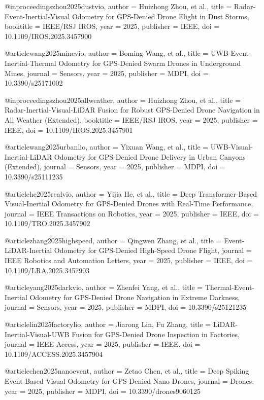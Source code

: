 @inproceedings{zhou2025dustvio,
  author = {Huizhong Zhou, et al.},
  title = {Radar-Event-Inertial-Visual Odometry for GPS-Denied Drone Flight in Dust Storms},
  booktitle = {IEEE/RSJ IROS},
  year = {2025},
  publisher = {IEEE},
  doi = {10.1109/IROS.2025.3457900}
}

@article{wang2025minevio,
  author = {Boming Wang, et al.},
  title = {UWB-Event-Inertial-Thermal Odometry for GPS-Denied Swarm Drones in Underground Mines},
  journal = {Sensors},
  year = {2025},
  publisher = {MDPI},
  doi = {10.3390/s25171002}
}

@inproceedings{zhou2025allweather,
  author = {Huizhong Zhou, et al.},
  title = {Radar-Inertial-Visual-LiDAR Fusion for Robust GPS-Denied Drone Navigation in All Weather (Extended)},
  booktitle = {IEEE/RSJ IROS},
  year = {2025},
  publisher = {IEEE},
  doi = {10.1109/IROS.2025.3457901}
}

@article{wang2025urbanlio,
  author = {Yixuan Wang, et al.},
  title = {UWB-Visual-Inertial-LiDAR Odometry for GPS-Denied Drone Delivery in Urban Canyons (Extended)},
  journal = {Sensors},
  year = {2025},
  publisher = {MDPI},
  doi = {10.3390/s25111235}
}

@article{he2025realvio,
  author = {Yijia He, et al.},
  title = {Deep Transformer-Based Visual-Inertial Odometry for GPS-Denied Drones with Real-Time Performance},
  journal = {IEEE Transactions on Robotics},
  year = {2025},
  publisher = {IEEE},
  doi = {10.1109/TRO.2025.3457902}
}

@article{zhang2025highspeed,
  author = {Qingwen Zhang, et al.},
  title = {Event-LiDAR-Inertial Odometry for GPS-Denied High-Speed Drone Flight},
  journal = {IEEE Robotics and Automation Letters},
  year = {2025},
  publisher = {IEEE},
  doi = {10.1109/LRA.2025.3457903}
}

@article{yang2025darkvio,
  author = {Zhenfei Yang, et al.},
  title = {Thermal-Event-Inertial Odometry for GPS-Denied Drone Navigation in Extreme Darkness},
  journal = {Sensors},
  year = {2025},
  publisher = {MDPI},
  doi = {10.3390/s25121235}
}

@article{lin2025factorylio,
  author = {Jiarong Lin, Fu Zhang},
  title = {LiDAR-Inertial-Visual-UWB Fusion for GPS-Denied Drone Inspection in Factories},
  journal = {IEEE Access},
  year = {2025},
  publisher = {IEEE},
  doi = {10.1109/ACCESS.2025.3457904}
}

@article{chen2025nanoevent,
  author = {Zetao Chen, et al.},
  title = {Deep Spiking Event-Based Visual Odometry for GPS-Denied Nano-Drones},
  journal = {Drones},
  year = {2025},
  publisher = {MDPI},
  doi = {10.3390/drones9060125}
}

